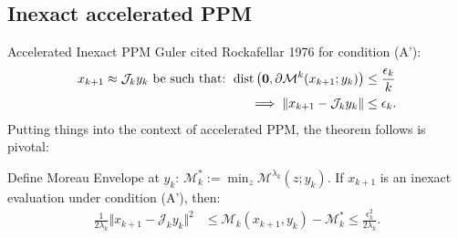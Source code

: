 \documentclass[11pt]{beamer}
\begin{document}
    \subsection{Inexact accelerated PPM}
        \begin{frame}{Accelerated Inexact PPM}
            Guler cited Rockafellar 1976 \cite{rockafellar_monotone_1976} for condition (A'): 
            \begin{align*}
                x_{k + 1}\approx \mathcal J_{k} y_k \text{ be such that: }
                \operatorname{dist}\left(
                    \mathbf 0, \partial \mathcal M^{k}(x_{k + 1}; y_k)
                \right) &\le \frac{\epsilon_k}{k}
                \\
                \implies 
                \Vert x_{k + 1} - \mathcal J_{k}y_k\Vert 
                &\le \epsilon_k. 
            \end{align*}
            Putting things into the context of accelerated PPM, the theorem follows is pivotal: 
            \begin{theorem}
                Define Moreau Envelope at $y_k$: $\mathcal M_k^* := \min_z \mathcal {M}^{\lambda_k}(z; y_k)$. 
                If $x_{k +1}$ is an inexact evaluation under condition (A'), then: 
                \begin{align*}
                    \frac{1}{2\lambda_k} \Vert x_{k + 1} - \mathcal J_k y_k\Vert^2
                    &\le 
                    \mathcal M_k(x_{k + 1}, y_k) - \mathcal M^*_k
                    \le \frac{\epsilon_k^2}{2\lambda_k}. 
                \end{align*}
            \end{theorem}
        \end{frame}
\end{document}
